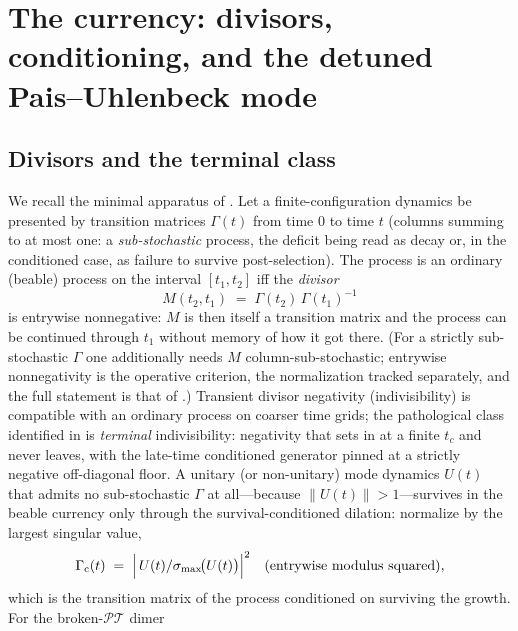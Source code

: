 \documentclass[11pt]{article}
\theoremstyle{definition}
\theoremstyle{remark}
\newcommand{\PT}{\mathcal{PT}}
\newcommand{\norm}[1]{\left\lVert #1 \right\rVert}
\begin{document}
\section{The currency: divisors, conditioning, and the detuned
Pais--Uhlenbeck mode}
\label{sec:currency}

\subsection{Divisors and the terminal class}
\label{sec:divisor}

We recall the minimal apparatus of \cite{indivisible}. Let a
finite-configuration dynamics be presented by transition matrices
$\Gamma(t)$ from time $0$ to time $t$ (columns summing to at most
one: a \emph{sub-stochastic} process, the deficit being read as
decay or, in the conditioned case, as failure to survive
post-selection). The process is an ordinary (beable) process on the
interval $[t_{1},t_{2}]$ iff the \emph{divisor}
\begin{equation}
M(t_{2},t_{1})\;=\;\Gamma(t_{2})\,\Gamma(t_{1})^{-1}
\label{eq:divisor}
\end{equation}
is entrywise nonnegative: $M$ is then itself a transition matrix and
the process can be continued through $t_{1}$ without memory of how it
got there. (For a strictly sub-stochastic $\Gamma$ one additionally
needs $M$ column-sub-stochastic; entrywise nonnegativity is the
operative criterion, the normalization tracked separately, and the full
statement is that of \cite{indivisible}.) Transient divisor negativity (indivisibility) is
compatible with an ordinary process on coarser time grids; the
pathological class identified in \cite{indivisible} is
\emph{terminal} indivisibility: negativity that sets in at a finite
$t_{c}$ and never leaves, with the late-time conditioned generator
pinned at a strictly negative off-diagonal floor. A unitary (or
non-unitary) mode dynamics $U(t)$ that admits no sub-stochastic
$\Gamma$ at all---because $\norm{U(t)}>1$---survives in the beable
currency only through the survival-conditioned dilation: normalize by
the largest singular value,
\begin{equation}
\Gamma_{\mathrm{c}}(t)\;=\;
\Bigl|\,U(t)/\sigma_{\max}\!\bigl(U(t)\bigr)\Bigr|^{2}
\quad(\text{entrywise modulus squared}),
\label{eq:conditioned}
\end{equation}
which is the transition matrix of the process conditioned on
surviving the growth. For the broken-$\PT$ dimer
\end{document}
